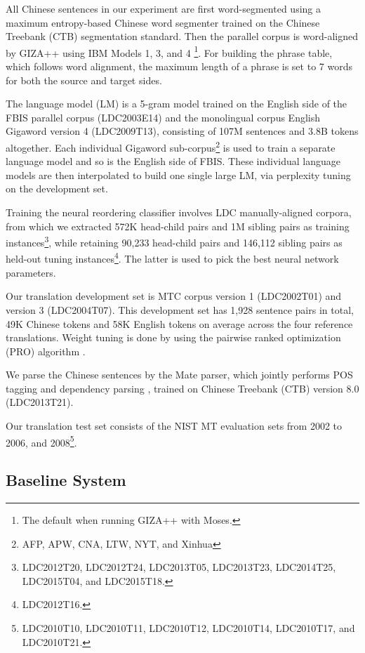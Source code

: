 \documentclass[letterpaper]{article}
\begin{document}
All Chinese sentences in our experiment are first word-segmented using a maximum entropy-based Chinese word segmenter \cite{low_maximum_2005} trained on the Chinese Treebank (CTB) segmentation standard. Then the parallel corpus is word-aligned by GIZA++ \cite{och_systematic_2003} using IBM Models 1, 3, and 4 \cite{brown_mathematics_1993}\footnote{The default when running GIZA++ with Moses.}. For building the phrase table, which follows word alignment, the maximum length of a phrase is set to 7 words for both the source and target sides.

The language model (LM) is a 5-gram model trained on the English side of the FBIS parallel corpus (LDC2003E14) and the monolingual corpus English Gigaword version 4 (LDC2009T13), consisting of 107M sentences and 3.8B tokens altogether. Each individual Gigaword sub-corpus\footnote{AFP, APW, CNA, LTW, NYT, and Xinhua} is used to train a separate language model and so is the English side of FBIS. These individual language models are then interpolated to build one single large LM, via perplexity tuning on the development set.

Training the neural reordering classifier involves LDC manually-aligned corpora, from which we extracted 572K head-child pairs and 1M sibling pairs as training instances\footnote{LDC2012T20, LDC2012T24, LDC2013T05, LDC2013T23, LDC2014T25, LDC2015T04, and LDC2015T18.}, while retaining 90,233 head-child pairs and 146,112 sibling pairs as held-out tuning instances\footnote{LDC2012T16.}. The latter is used to pick the best neural network parameters.

Our translation development set is MTC corpus version 1 (LDC2002T01) and version 3 (LDC2004T07). This development set has 1,928 sentence pairs in total, 49K Chinese tokens and 58K English tokens on average across the four reference translations. Weight tuning is done by using the pairwise ranked optimization (PRO) algorithm \cite{hopkins_tuning_2011}.

We parse the Chinese sentences by the Mate parser, which jointly performs POS tagging and dependency parsing \cite{bohnet_transition-based_2012}, trained on Chinese Treebank (CTB) version 8.0 (LDC2013T21).

Our translation test set consists of the NIST MT evaluation sets from 2002 to 2006, and 2008\footnote{LDC2010T10, LDC2010T11, LDC2010T12, LDC2010T14, LDC2010T17, and LDC2010T21.}.

\subsection{Baseline System}
\end{document}
